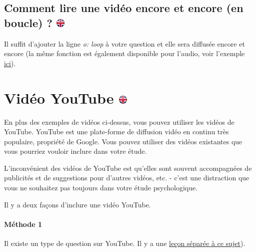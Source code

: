 \documentclass[
]{book}
\begin{document}
\hypertarget{comment-lire-une-viduxe9o-encore-et-encore-en-boucle}{%
\subsection[Comment lire une vidéo encore et encore (en boucle) ?
]{\texorpdfstring{Comment lire une vidéo encore et encore (en boucle) ?
\href{https://www.psytoolkit.org/lessons/surveyaudiovideo.html\#_how_to_play_a_video_again_and_again_loop}{\protect\includegraphics{img/ukflag.png}}}{Comment lire une vidéo encore et encore (en boucle) ? }}\label{comment-lire-une-viduxe9o-encore-et-encore-en-boucle}}

Il suffit d'ajouter la ligne \emph{o: loop} à votre question et elle
sera diffusée encore et encore (la même fonction est également
disponible pour l'audio, voir l'exemple
\protect\hyperlink{how_to_play_a_sound_again_and_again_loop}{ici}).

\hypertarget{viduxe9o-youtube}{%
\section[Vidéo YouTube ]{\texorpdfstring{Vidéo YouTube
\href{https://www.psytoolkit.org/lessons/surveyaudiovideo.html\#_youtube_video}{\protect\includegraphics{img/ukflag.png}}}{Vidéo YouTube }}\label{viduxe9o-youtube}}

En plus des exemples de vidéos ci-dessus, vous pouvez utiliser les
vidéos de YouTube. YouTube est une plate-forme de diffusion vidéo en
continu très populaire, propriété de Google. Vous pouvez utiliser des
vidéos existantes que vous pourriez vouloir inclure dans votre étude.

L'inconvénient des vidéos de YouTube est qu'elles sont souvent
accompagnées de publicités et de suggestions pour d'autres vidéos, etc.
- c'est une distraction que vous ne souhaitez pas toujours dans votre
étude psychologique.

Il y a deux façons d'inclure une vidéo YouTube.

\hypertarget{muxe9thode-1}{%
\paragraph{Méthode 1}\label{muxe9thode-1}}

Il existe un type de question sur YouTube. Il y a une
\href{https://www.psytoolkit.org/lessons/youtube_video.html}{leçon
séparée à ce sujet}).
\end{document}
